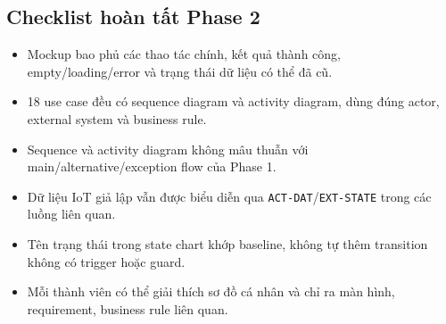 \subsection{Checklist hoàn tất Phase 2}

\begin{itemize}
  \item Mockup bao phủ các thao tác chính, kết quả thành công, empty/loading/error và trạng thái dữ liệu có thể đã cũ.
  \item 18 use case đều có sequence diagram và activity diagram, dùng đúng actor, external system và business rule.
  \item Sequence và activity diagram không mâu thuẫn với main/alternative/exception flow của Phase 1.
  \item Dữ liệu IoT giả lập vẫn được biểu diễn qua \texttt{ACT-DAT}/\texttt{EXT-STATE} trong các luồng liên quan.
  \item Tên trạng thái trong state chart khớp baseline, không tự thêm transition không có trigger hoặc guard.
  \item Mỗi thành viên có thể giải thích sơ đồ cá nhân và chỉ ra màn hình, requirement, business rule liên quan.
\end{itemize}
